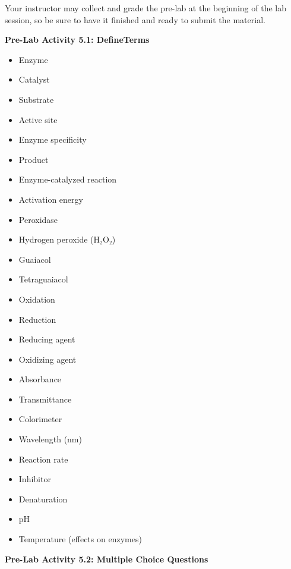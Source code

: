 \documentclass[
  letterpaper,
  DIV=11,
  numbers=noendperiod]{scrreprt}
\begin{document}
Your instructor may collect and grade the pre-lab at the beginning of
the lab session, so be sure to have it finished and ready to submit the
material.

\textbf{Pre-Lab Activity 5.1: DefineTerms}

\begin{itemize}
\item
  Enzyme
\item
  Catalyst
\item
  Substrate
\item
  Active site
\item
  Enzyme specificity
\item
  Product
\item
  Enzyme-catalyzed reaction
\item
  Activation energy
\item
  Peroxidase
\item
  Hydrogen peroxide (H₂O₂)
\item
  Guaiacol
\item
  Tetraguaiacol
\item
  Oxidation
\item
  Reduction
\item
  Reducing agent
\item
  Oxidizing agent
\item
  Absorbance
\item
  Transmittance
\item
  Colorimeter
\item
  Wavelength (nm)
\item
  Reaction rate
\item
  Inhibitor
\item
  Denaturation
\item
  pH
\item
  Temperature (effects on enzymes)
\end{itemize}

\textbf{Pre-Lab Activity 5.2: Multiple Choice Questions}
\end{document}
